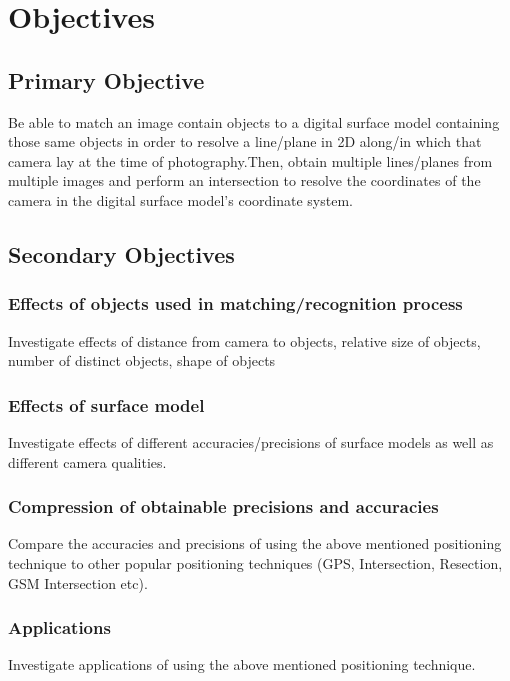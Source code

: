 \section{Objectives}
\subsection{Primary Objective}
Be able to match an image contain objects to a digital surface model containing those same objects in order to resolve a line/plane in 2D along/in which that camera lay at the time of photography.Then, obtain multiple lines/planes from multiple images and perform an intersection to resolve the coordinates of the camera in the digital surface model's coordinate system.

\subsection{Secondary Objectives}

\subsubsection{Effects of objects used in matching/recognition process}
Investigate effects of distance from camera to objects, relative size of objects, number of distinct objects, shape of objects

\subsubsection{Effects of surface model}
Investigate effects of different accuracies/precisions of surface models as well as different camera qualities.

\subsubsection{Compression of obtainable precisions and accuracies}
Compare the accuracies and precisions of using the above mentioned positioning technique to other popular positioning techniques (GPS, Intersection, Resection, GSM Intersection etc).

\subsubsection{Applications}
Investigate applications of using the above mentioned positioning technique.